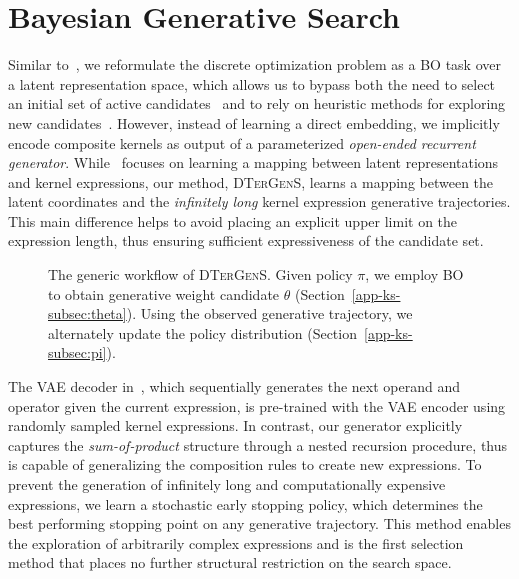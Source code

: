 \label{app:ks}
\section{Bayesian Generative Search}
\label{app-ks-sec:method}
Similar to~\citet{Lu18}, we reformulate the discrete optimization problem as a BO task over a latent representation space, which allows us to bypass both the need to select an initial set of active candidates~\cite{Duvenaud13} and to rely on heuristic methods for exploring new candidates~\cite{Malkomes16}. However, instead of learning a direct embedding, we implicitly encode composite kernels as output of a parameterized \emph{open-ended recurrent generator}. While~\citet{Lu18} focuses on learning a mapping between latent representations and kernel expressions, our method, \textsc{DTerGenS}, learns a mapping between the latent coordinates and the \emph{infinitely long} kernel expression generative trajectories. This main difference helps to avoid placing an explicit upper limit on the expression length, thus ensuring sufficient expressiveness of the candidate set. 

\begin{figure}
\centering
{}
\caption{The generic workflow of \textsc{DTerGenS}. Given policy $\pi$, we employ BO to obtain generative weight candidate $\theta$ (Section~\ref{app-ks-subsec:theta}). Using the observed generative trajectory, we alternately update the policy distribution (Section~\ref{app-ks-subsec:pi}).}
\label{app-fig:workflow}
\end{figure}

The VAE decoder in~\cite{Lu18}, which sequentially generates the next operand and operator given the current expression, is pre-trained with the VAE encoder using randomly sampled kernel expressions. In contrast, our generator explicitly captures the \emph{sum-of-product} structure through a nested recursion procedure, thus is capable of generalizing the composition rules to create new expressions. To prevent the generation of infinitely long and computationally expensive expressions, we learn a stochastic early stopping policy, which determines the best performing stopping point on any generative trajectory. This method enables the exploration of arbitrarily complex expressions and is the first selection method that places no further structural restriction on the search space.

